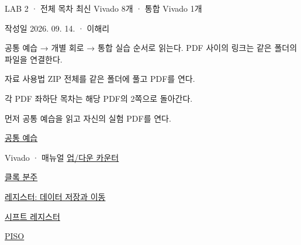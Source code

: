 
\renewcommand{\legacySource}[1]{}
\newcommand{\terminalbox}[1]{\par\vspace{0.15cm}{\setlength{\fboxsep}{7pt}\colorbox{black}{\parbox{\dimexpr\textwidth-14pt\relax}{\color{white}\ttfamily\fontsize{7}{9}\selectfont #1}}}\par\vspace{0.15cm}}

\renewcommand{\small}{\fontsize{9}{11}\selectfont}
\begin{frame}{LAB 2 · 전체 목차}
\small
최신 Vivado 8개 · 통합 Vivado 1개\par\vspace{0.26cm}작성일 2026. 09. 14. · 이해리\par\vspace{0.26cm}공통 예습 → 개별 회로 → 통합 실습 순서로 읽는다. PDF 사이의 링크는 같은 폴더의 파일을 연결한다.\par
\end{frame}

\begin{frame}[label=lab2-contents]{자료 사용법}
\small
ZIP 전체를 같은 폴더에 풀고 PDF를 연다.\par\vspace{0.26cm}각 PDF 좌하단 목차는 해당 PDF의 2쪽으로 돌아간다.\par\vspace{0.26cm}먼저 공통 예습을 읽고 자신의 실험 PDF를 연다.\par\href{05.LAB2_00_START.pdf}{공통 예습}
\end{frame}

\begin{frame}{Vivado · 매뉴얼}
\small
\href{05.LAB2_01_COUNTER_VIVADO.pdf}{업/다운 카운터}\par\vspace{0.3cm}
\href{05.LAB2_02_CLOCK_DIVIDER_VIVADO.pdf}{클록 분주}\par\vspace{0.3cm}
\href{05.LAB2_03_REGISTER_VIVADO.pdf}{레지스터: 데이터 저장과 이동}\par\vspace{0.3cm}
\href{05.LAB2_04_SHIFT_REGISTER_VIVADO.pdf}{시프트 레지스터}\par\vspace{0.3cm}
\href{05.LAB2_05_PISO_VIVADO.pdf}{PISO}\par\vspace{0.3cm}
\end{frame}

